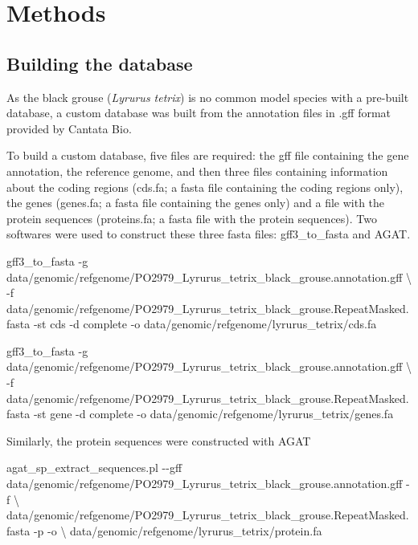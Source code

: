 \documentclass[
  letterpaper,
  DIV=11,
  numbers=noendperiod]{scrreprt}
\newenvironment{Shaded}{}{}
\newcommand{\NormalTok}[1]{\textcolor[rgb]{0.14,0.16,0.18}{#1}}
\begin{document}
\section{Methods}\label{methods}

\subsection{Building the database}\label{building-the-database}

As the black grouse (\emph{Lyrurus tetrix}) is no common model species
with a pre-built database, a custom database was built from the
annotation files in .gff format provided by Cantata Bio.

To build a custom database, five files are required: the gff file
containing the gene annotation, the reference genome, and then three
files containing information about the coding regions (cds.fa; a fasta
file containing the coding regions only), the genes (genes.fa; a fasta
file containing the genes only) and a file with the protein sequences
(proteins.fa; a fasta file with the protein sequences). Two softwares
were used to construct these three fasta files: gff3\_to\_fasta and
AGAT.

\begin{Shaded}
\begin{Highlighting}[]
\NormalTok{gff3\_to\_fasta {-}g data/genomic/refgenome/PO2979\_Lyrurus\_tetrix\_black\_grouse.annotation.gff \textbackslash{}}
\NormalTok{    {-}f data/genomic/refgenome/PO2979\_Lyrurus\_tetrix\_black\_grouse.RepeatMasked.fasta {-}st cds {-}d complete {-}o data/genomic/refgenome/lyrurus\_tetrix/cds.fa }

\NormalTok{gff3\_to\_fasta {-}g data/genomic/refgenome/PO2979\_Lyrurus\_tetrix\_black\_grouse.annotation.gff \textbackslash{}}
\NormalTok{    {-}f data/genomic/refgenome/PO2979\_Lyrurus\_tetrix\_black\_grouse.RepeatMasked.fasta {-}st gene {-}d complete {-}o data/genomic/refgenome/lyrurus\_tetrix/genes.fa }
\end{Highlighting}
\end{Shaded}

Similarly, the protein sequences were constructed with AGAT

\begin{Shaded}
\begin{Highlighting}[]
\NormalTok{agat\_sp\_extract\_sequences.pl {-}{-}gff data/genomic/refgenome/PO2979\_Lyrurus\_tetrix\_black\_grouse.annotation.gff {-}f \textbackslash{}}
\NormalTok{    data/genomic/refgenome/PO2979\_Lyrurus\_tetrix\_black\_grouse.RepeatMasked.fasta {-}p {-}o \textbackslash{}}
\NormalTok{    data/genomic/refgenome/lyrurus\_tetrix/protein.fa}
\end{Highlighting}
\end{Shaded}
\end{document}
